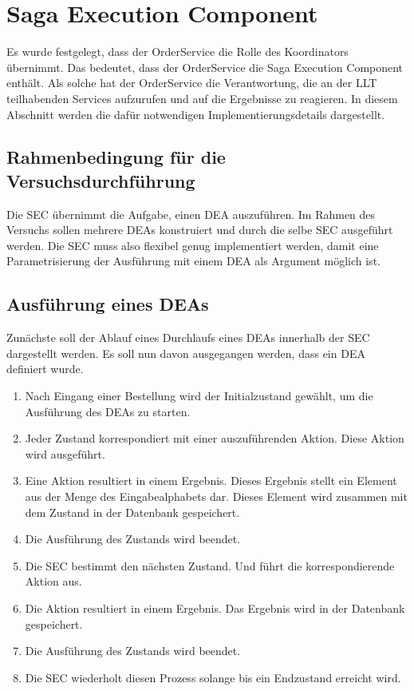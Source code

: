 \section{Saga Execution Component}

Es wurde festgelegt, dass der OrderService die Rolle des Koordinators übernimmt. Das bedeutet, dass der OrderService die Saga Execution Component enthält. Als solche hat der OrderService die Verantwortung, die an der LLT teilhabenden Services aufzurufen und auf die Ergebnisse zu reagieren. In diesem Abschnitt werden die dafür notwendigen Implementierungsdetails dargestellt.

\subsection{Rahmenbedingung für die Versuchsdurchführung}
Die SEC übernimmt die Aufgabe, einen DEA auszuführen. Im Rahmen des Versuchs sollen mehrere DEAs konstruiert und durch die selbe SEC ausgeführt werden. Die SEC muss also flexibel genug implementiert werden, damit eine Parametrisierung der Ausführung mit einem DEA als Argument möglich ist. 

\subsection{Ausführung eines DEAs}
Zunächste soll der Ablauf eines Durchlaufs eines DEAs innerhalb der SEC dargestellt werden. Es soll nun davon ausgegangen werden, dass ein DEA definiert wurde. 

\begin{enumerate}
	\item Nach Eingang einer Bestellung wird der Initialzustand gewählt, um die Ausführung des DEAs zu starten.
	\item Jeder Zustand korrespondiert mit einer auszuführenden Aktion. Diese Aktion wird ausgeführt. 
	\item Eine Aktion resultiert in einem Ergebnis. Dieses Ergebnis stellt ein Element aus der Menge des Eingabealphabets dar. Dieses Element wird zusammen mit dem Zustand in der Datenbank gespeichert. 
	\item Die Ausführung des Zustands wird beendet.
	\item Die SEC bestimmt den nächsten Zustand. Und führt die korrespondierende Aktion aus.
	\item Die Aktion resultiert in einem Ergebnis. Das Ergebnis wird in der Datenbank gespeichert. 
	\item Die Ausführung des Zustands wird beendet. 
	\item Die SEC wiederholt diesen Prozess solange bis ein Endzustand erreicht wird. 
\end{enumerate}

